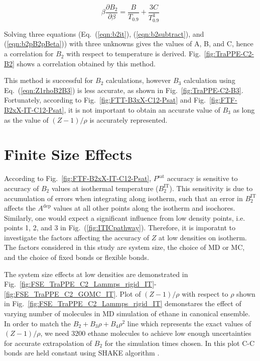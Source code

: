 \documentclass[%
 aip,
 jcp,
 sd,%
 amsmath,amssymb,
 reprint,%
]{revtex4-1}
\begin{document}
\begin{equation}
\beta \frac{\partial B_2}{\partial \beta}=\frac{B}{T_{0.9}}+\frac{3C}{T_{0.9}^3} \label{eqn:b2pB2pBeta}
\end{equation}

Solving three equations (Eq.~(\ref{eqn:b2it}), (\ref{eqn:b2subtract}), and (\ref{eqn:b2pB2pBeta})) with three unknowns gives the values of A, B, and C, hence a correlation for $B_2$ with respect to temperature is derived. Fig.~\ref{fig:TraPPE-C2-B2} shows a correlation obtained by this method. 

This method is successful for $B_2$ calculations, however $B_3$ calculation using Eq.~(\ref{eqn:Z1rhoB2B3}) is less accurate, as shown in Fig.~\ref{fig:TraPPE-C2-B3}. Fortunately, according to Fig.~\ref{fig:FTT-B3xX-C12-Psat} and Fig.~\ref{fig:FTF-B2xX-IT-C12-Psat}, it is not important to obtain an accurate value of $B_3$ as long as the value of $(Z-1)/\rho$ is accurately represented.

\section{Finite Size Effects}\label{sec:FSE}
According to Fig.~\ref{fig:FTF-B2xX-IT-C12-Psat}, $P^{\mathrm{sat}}$ accuracy is sensitive to accuracy of $B_2$ values at isothermal temperature ($B_2^{\mathrm{IT}}$). This sensitivity is due to accumulation of errors when integrating along isotherm, such that an error in $B_2^{\mathrm{IT}}$ affects the $A^{\mathrm{dep}}$ values at all other points along the isotherm and isochores. Similarly, one would expect a significant influence from low density points, i.e. points 1, 2, and 3 in Fig.~(\ref{fig:ITICpathway}). Therefore, it is imporatnt to investigate the factors affecting the accuracy of $Z$ at low densities on isotherm. The factors considered in this study are system size, the choice of MD or MC, and the choice of fixed bonds or flexible bonds. 

The system size effects at low densities are demonstrated in Fig.~\ref{fig:FSE_TraPPE_C2_Lammps_rigid_IT}-\ref{fig:FSE_TraPPE_C2_GOMC_IT}. Plot of $(Z-1)/\rho$ with respect to $\rho$ shown in Fig.~\ref{fig:FSE_TraPPE_C2_Lammps_rigid_IT} demonstares the effect of varying number of molecules in MD simulation of ethane in canonical ensemble. In order to match the $B_2+B_3 \rho+B_4 \rho^2$ line which represents the exact values of $(Z-1)/\rho$, we need 3200 ethane molecules to achieve low enough uncertainties for accurate extrapolation of $B_2$ for the simulation times chosen. In this plot C-C bonds are held constant using SHAKE algorithm \cite{Ryckaert1977}. 
\end{document}
